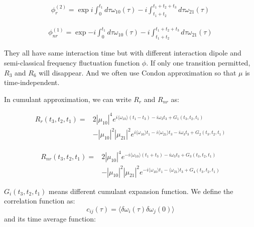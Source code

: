 \documentclass[12pt,a4paper,scale=1.0]{article}
\begin{document}
	 \begin{equation}  
	 \begin{aligned}
	 \phi^{(2)}_{r} = \exp{i\int_{0}^{t_1} d\tau \omega_{10}(\tau) - i\int_{t_1+t_2}^{t_1+t_2+t_3}d\tau \omega_{21}(\tau) }
	 \end{aligned}
	 \end{equation}
	 
	 \begin{equation}  \label{equ:basic-end}
	 \begin{aligned}
	 \phi^{(1)}_{nr} = \exp{ - i \int_{0}^{t_1} d\tau \omega_{10}(\tau) - i\int_{t_1+t_2}^{t_1+t_2+t_3}d\tau \omega_{21}(\tau) }
	 \end{aligned}
	 \end{equation}
	 
	 
	 
	 
	 They all have same interaction time but with different interaction dipole and semi-classical frequency fluctuation function $\phi$. If only one transition permitted, $R_3$ and $R_6$ will disappear. And we often use Condon approximation so that $\mu$ is time-independent.
	  
	 
	 
	 In cumulant approximation, we can write $R_r$ and $R_{nr}$ as:
	 
	 \begin{equation} \label{equ:1-2} 
	 \begin{aligned} 
	  R_r(t_3,t_2,t_1) = & 2 | \mu _{10} | ^ 4
	   e^{i \langle \omega_{10} \rangle (t_1 - t_3 ) -i\omega_3 t_3 + G_1(t_3,t_2,t_1) } \\
	   & -    | \mu _{10} | ^ 2  | \mu _{21} | ^ 2
	   e^{i \langle \omega_{10} \rangle t_1 -   i \langle \omega_{21} \rangle t_3
	   	 -i\omega_3 t_3 + G_2(t_3,t_2,t_1) } 
	 \end{aligned} 
	 \end{equation} 
	 
	 
	 \begin{equation} \label{equ:1-3} 
	 \begin{aligned} 
	 R_{nr }(t_3,t_2,t_1) = & 2 | \mu _{10} | ^ 4
	 e^{-i \langle \omega_{10} \rangle (t_1 + t_3 ) -i\omega_3 t_3 + G_3(t_3,t_2,t_1) } \\
	 & -    | \mu _{10} | ^ 2  | \mu _{21} | ^ 2
	 e^{-i \langle \omega_{10} \rangle t_1  - \langle \omega_{21} \rangle t_3   + G_4(t_3,t_2,t_1) } 
	 \end{aligned} 
	 \end{equation}
	 
	 $G_i(t_3,t_2,t_1)$ means different cumulant expansion function. We define the correlation function as:
	 \begin{equation} \label{equ:1-4} 
	 c_{ij} ( \tau ) =  \langle \delta \omega_{i}(\tau)  \delta \omega_{j}(0) \rangle  
	 \end{equation}
	 and its time average function:
	 
\end{document}
